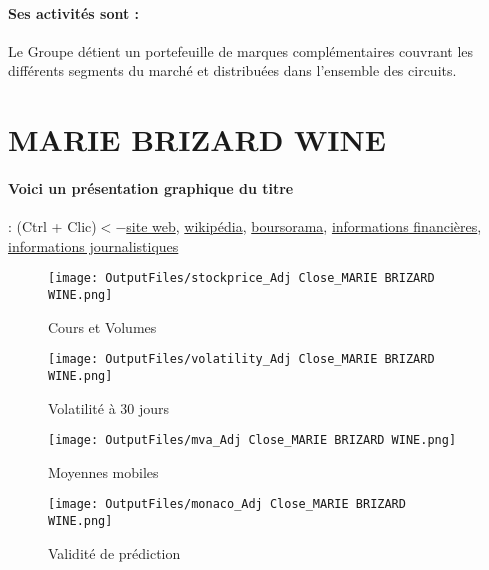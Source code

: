 \documentclass[11pt,a4paper]{report}%
\begin{document}
\paragraph{Ses activités sont : } Le Groupe détient un portefeuille de marques complémentaires couvrant les différents segments du marché et distribuées dans l’ensemble des circuits. 
    
    \newpage

\section{MARIE BRIZARD WINE}

\paragraph{Voici un présentation graphique du titre} : (Ctrl + Clic)$<-$\href{http://www.mariebrizard.com/}{site web}, \href{https://fr.wikipedia.org/wiki/Marie_Brizard}{wikipédia}, \href{https://www.boursorama.com/cours/1rPMBWS}{boursorama}, \href{https://www.qwant.com/?q=site:https:%2f%2fwww.easybourse.com%2faction-societe%2fMARIE-BRIZARD-WINE&t=web&client=ext-firefox-hp}{informations financières}, \href{https://bourse.lerevenu.com/cours-de-bourse/fiche-valeur-synthese/MARIE-BRIZARD-WINE/MBWS-FR}{informations journalistiques}
\begin{figure}[!htb]
   \begin{minipage}{0.5\textwidth}
     \centering
     \texttt{[image: OutputFiles/stockprice\_Adj Close\_MARIE BRIZARD WINE.png]}
     \caption{Cours et Volumes}\label{Fig:price_MARIE BRIZARD WINE}
   \end{minipage}\hfill
   \begin{minipage}{0.5\textwidth}
     \centering
     \texttt{[image: OutputFiles/volatility\_Adj Close\_MARIE BRIZARD WINE.png]}
     \caption{Volatilité à 30 jours}\label{Fig:volat_MARIE BRIZARD WINE}
   \end{minipage}
\end{figure}
\begin{figure}[!htb]
   \begin{minipage}{0.5\textwidth}
     \centering
     \texttt{[image: OutputFiles/mva\_Adj Close\_MARIE BRIZARD WINE.png]}
     \caption{Moyennes mobiles}\label{Fig:mva_MARIE BRIZARD WINE}
   \end{minipage}\hfill
   \begin{minipage}{0.5\textwidth}
     \centering
     \texttt{[image: OutputFiles/monaco\_Adj Close\_MARIE BRIZARD WINE.png]}
     \caption{Validité de prédiction}\label{Fig:prediction_MARIE BRIZARD WINE}
   \end{minipage}
\end{figure}
\end{document}
